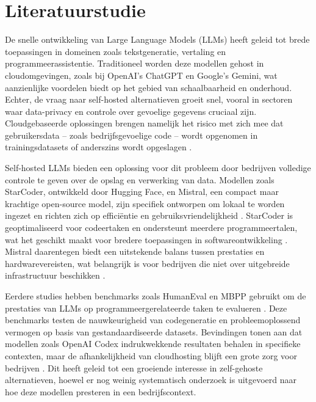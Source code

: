 
\section{Literatuurstudie}%
\label{sec:literatuurstudie}

De snelle ontwikkeling van Large Language Models (LLMs) heeft geleid tot brede toepassingen in domeinen zoals tekstgeneratie, vertaling en programmeerassistentie. Traditioneel worden deze modellen gehost in cloudomgevingen, zoals bij OpenAI's ChatGPT en Google's Gemini, wat aanzienlijke voordelen biedt op het gebied van schaalbaarheid en onderhoud. Echter, de vraag naar self-hosted alternatieven groeit snel, vooral in sectoren waar data-privacy en controle over gevoelige gegevens cruciaal zijn. Cloudgebaseerde oplossingen brengen namelijk het risico met zich mee dat gebruikersdata – zoals bedrijfsgevoelige code – wordt opgenomen in trainingsdatasets of anderszins wordt opgeslagen \autocite{Brown2020}.

Self-hosted LLMs bieden een oplossing voor dit probleem door bedrijven volledige controle te geven over de opslag en verwerking van data. Modellen zoals StarCoder, ontwikkeld door Hugging Face, en Mistral, een compact maar krachtige open-source model, zijn specifiek ontworpen om lokaal te worden ingezet en richten zich op efficiëntie en gebruiksvriendelijkheid \autocite{Tunstall2023, Team2023}. StarCoder is geoptimaliseerd voor codeertaken en ondersteunt meerdere programmeertalen, wat het geschikt maakt voor bredere toepassingen in softwareontwikkeling \autocite{Li2022}. Mistral daarentegen biedt een uitstekende balans tussen prestaties en hardwarevereisten, wat belangrijk is voor bedrijven die niet over uitgebreide infrastructuur beschikken \autocite{Mistral2023}.

Eerdere studies hebben benchmarks zoals HumanEval en MBPP gebruikt om de prestaties van LLMs op programmeergerelateerde taken te evalueren \autocite{Chen2021}. Deze benchmarks testen de nauwkeurigheid van codegeneratie en probleemoplossend vermogen op basis van gestandaardiseerde datasets. Bevindingen tonen aan dat modellen zoals OpenAI Codex indrukwekkende resultaten behalen in specifieke contexten, maar de afhankelijkheid van cloudhosting blijft een grote zorg voor bedrijven \autocite{Chen2021, Brown2020}. Dit heeft geleid tot een groeiende interesse in zelf-gehoste alternatieven, hoewel er nog weinig systematisch onderzoek is uitgevoerd naar hoe deze modellen presteren in een bedrijfscontext.

